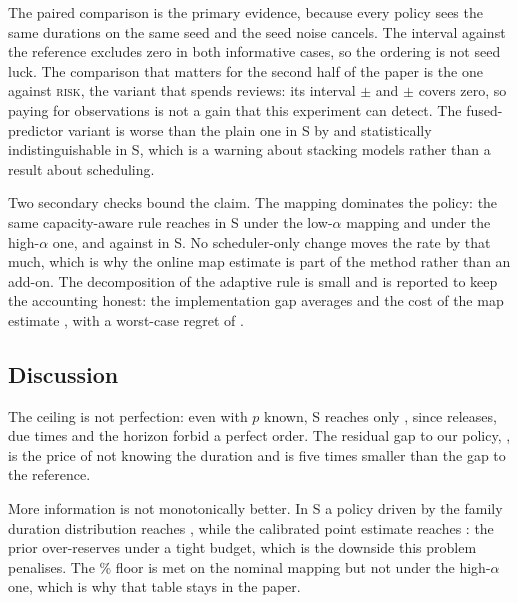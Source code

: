 \documentclass{swmcmthesis}
\begin{document}
The paired comparison is the primary evidence, because every policy sees the same
durations on the same seed and the seed noise cancels. The interval against the
reference excludes zero in both informative cases, so the ordering is not seed luck.
The comparison that matters for the second half of the paper is the one against
\textsc{risk}, the variant that spends reviews: its interval
\slotPStochPairSTwoRiskFusionDiff{}$\pm$\slotPStochPairSTwoRiskFusionCI{} and
\slotPStochPairSThreeRiskFusionDiff{}$\pm$\slotPStochPairSThreeRiskFusionCI{} covers
zero, so paying for observations is not a gain that this experiment can detect. The
fused-predictor variant is worse than the plain one in S\slotCaseTwo{} by
\slotPStochPairSTwoSlackFusionDiff{} and statistically indistinguishable in
S\slotCaseThree, which is a warning about stacking models rather than a result about
scheduling.

Two secondary checks bound the claim. The mapping dominates the policy: the same
capacity-aware rule reaches \slotPMapSThreeLowAlpha{} in S\slotCaseThree{} under the
low-$\alpha$ mapping and \slotPMapSThreeHighAlpha{} under the high-$\alpha$ one, and
\slotPMapSTwoLowAlpha{} against \slotPMapSTwoHighAlpha{} in S\slotCaseTwo. No
scheduler-only change moves the rate by that much, which is why the online map
estimate is part of the method rather than an add-on. The decomposition of the
adaptive rule is small and is reported to keep the accounting honest: the
implementation gap averages \slotPAdaptImplGapMean{} and the cost of the map estimate
\slotPAdaptAlphaCostMean{}, with a worst-case regret of \slotPAdaptRegretMax.

\subsection{Discussion}
\label{sec:p3disc}

The ceiling is not perfection: even with $p$ known, S\slotCaseThree{} reaches only
\slotPStochSThreeOracleETA{}, since releases, due times and the horizon forbid a
perfect order. The residual gap to our policy, \slotPInfoGapSThree{}, is the price of
not knowing the duration and is five times smaller than the gap to the reference.

More information is not monotonically better. In S\slotCaseThree{} a policy driven by
the family duration distribution reaches \slotPInfoFamSThree{}, while the calibrated
point estimate reaches \slotPInfoFamPCSThree{}: the prior over-reserves under a tight
budget, which is the downside this problem penalises. The \slotOnTimeFloorPct{}\%
floor is met on the nominal mapping but not under the high-$\alpha$ one, which is why
that table stays in the paper.
\end{document}

